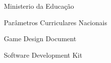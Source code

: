 \item[ MEC ]			Ministerio da Educação
\item[ PCN ]            Parâmetros Curriculares Nacionais
\item[ GDD ]            Game Design Document
\item[ SDK ]            Software Development Kit

